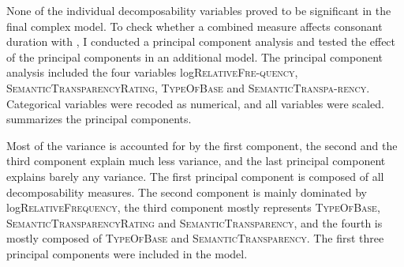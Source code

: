 None of the individual decomposability variables proved to be significant in the final complex model. To check whether a combined  measure affects consonant duration with , I conducted a principal component analysis and tested the effect of the principal components in an additional model. The principal component analysis included the four variables log\textsc{RelativeFre-quency}, \textsc{SemanticTransparencyRating}, \textsc{TypeOfBase} and \textsc{SemanticTranspa-rency}. Categorical variables were recoded as numerical, and all variables were scaled.  summarizes the principal components.



\begin{table}
	\caption{Summary of principal components\label{tbl: summary PC dis exp}}
\end{table}


Most of the variance is accounted for by the first component, the second and the third component explain much less variance, and the last principal component explains barely any variance. 
The first principal component is composed of all decomposability measures. The second component is mainly dominated by log\textsc{RelativeFrequency}, the third component mostly represents \textsc{TypeOfBase}, \textsc{SemanticTransparencyRating} and \textsc{SemanticTransparency}, and the fourth is mostly composed of \textsc{TypeOfBase} and \textsc{SemanticTransparency}. The first three principal components were included in the model.


